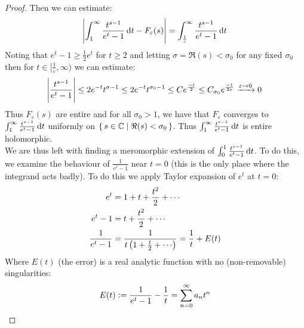 \begin{proof}
Then we can estimate:
\begin{align*}
    \abs{\int_1^\infty \frac{t^{s-1}}{e^t - 1}  \dif t - F_\varepsilon(s)} = \int_\frac{1}{\varepsilon}^\infty \frac{t^{s-1}}{e^t - 1}  \dif t
\end{align*}
Noting that $e^t-1 \geq \frac{1}{2} e^t$ for $t \geq 2$ and letting $\sigma  = \Re(s) < \sigma_0$ for any fixed $\sigma_0$ then for $t \in [ \frac{1}{\varepsilon}, \infty ) $  we can estimate:
\begin{align*}
    \abs{\frac{t^{s-1}}{e^t-1}} \leq 2 e^{-t} t^{\sigma - 1} \leq 2 e^{-t} t^{\sigma_0 - 1} \leq C e^{\frac{-t}{2}} \leq C_{\sigma_0} e^\frac{-1}{2\varepsilon} \xrightarrow[]{\varepsilon \to 0} 0
\end{align*}
Thus $F_\varepsilon(s)$ are entire and for all $\sigma_0 > 1$, we have that $F_\varepsilon$ converges to $\int_1^\infty \frac{t^{s-1}}{e^t - 1}  \dif t$ uniformly on $\set{s \in \mathbb{C}\mid \Re(s) < \sigma_0}$. Thus $\int_1^\infty \frac{t^{s-1}}{e^t - 1}  \dif t$ is entire holomorphic.\\

We are thus left with finding a meromorphic extension of $\int_0^1 \frac{t^{s-1}}{e^t - 1}  \dif t$. To do this, we examine the behaviour of $\frac{1}{e^t - 1}$ near $t=0$ (this is the only place where the integrand acts badly). To do this we apply Taylor expansion of $e^t$ at $t=0$:
\begin{align*}
    e^t &= 1+ t + \frac{t^2}{2}+ \cdots\\
    e^t-1 &=  t + \frac{t^2}{2}+ \cdots\\
    \frac{1}{e^t - 1} &= \frac{1}{t \br{1 + \frac{t}{2} + \cdots }} = \frac{1}{t} + E(t)
\end{align*}
Where $E(t)$ (the error) is a real analytic function with no (non-removable) singularities:
\begin{align*}
    E(t) \vcentcolon = \frac{1}{e^t-1} - \frac{1}{t} = \sum_{n=0}^\infty a_nt^n
\end{align*}



\end{proof}
